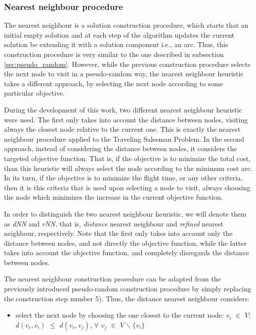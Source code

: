 \subsubsection{Nearest neighbour procedure}
\label{sec:nn}

The nearest neighbour is a solution construction procedure, which starts that an initial empty solution and at each step of the algorithm updates the current solution be extending it with a solution component i.e., an arc. Thus, this construction procedure is very similar to the one described in subsection \ref{sec:pseudo_random}. However, while the previous construction procedure selects the next node to visit in a pseudo-random way, the nearest neighbour heuristic takes a different approach, by selecting the next node according to some particular objective.

During the development of this work, two different nearest neighbour heuristic were used. The first only takes into account the distance between nodes, visiting always the closest node relative to the current one. This is exactly the nearest neighbour procedure applied to the Traveling Salesman Problem. In the second approach, instead of considering the distance between nodes, it considers the targeted objective function. That is, if the objective is to minimize the total cost, than this heuristic will always select the node according to the minimum cost arc. In its turn, if the objective is to minimize the flight time, or any other criteria, then it is this criteria that is used upon selecting a node to visit, always choosing the node which minimizes the increase in the current objective function. 

In order to distinguish the two nearest neighbour heuristic, we will denote them as \textit{dNN} and \textit{rNN}, that is, \textit{distance} nearest neighbour and  \textit{refined} nearest neighbour, respectively. Note that the first only takes into account only the distance between nodes, and not directly the objective function, while the latter takes into account the objective function, and completely disregards the distance between nodes.

The nearest neighbour construction procedure can be adapted from the previously introduced pseudo-random construction procedure by simply replacing the construction step number 5). Thus, the distance nearest neighbour considers:

\begin{itemize}
    \item select the next node by choosing the one closest to the current node: \newline
    $v_i$ $\in$ $V$: $d(v_c, v_i)$ $\leq$ $d(v_c, v_j)$,
    $\forall$ $v_j$ $\in$ $V$ $\backslash$ $\{v_i\}$   
\end{itemize}


